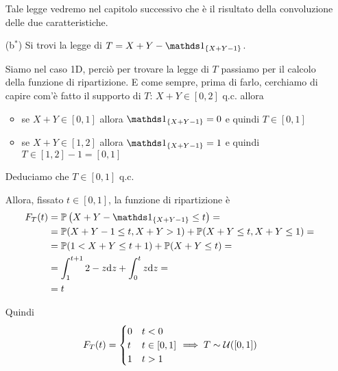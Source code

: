 \begin{enumerate}

\begin{oss} Tale legge vedremo nel capitolo successivo che è il risultato della convoluzione delle due caratteristiche. \end{oss}

\item [(b$^*$)] Si trovi la legge di $T=X+Y-\Ind_{\{ X+Y-1 \}}$.

Siamo nel caso 1D, perciò per trovare la legge di $T$ passiamo per il calcolo della funzione di ripartizione. E come sempre, prima di farlo, cerchiamo di capire com'è fatto il supporto di $T$: $X+Y\in[0,2]$ q.c. allora
\begin{itemize}
\item se $X+Y\in[0,1]$ allora $\Ind_{\{ X+Y-1 \}}=0$ e quindi $T\in[0,1]$
\item se $X+Y\in[1,2]$ allora $\Ind_{\{ X+Y-1 \}}=1$ e quindi $T\in[1,2]-1=[0,1]$
\end{itemize}
Deduciamo che $T\in[0,1]$ q.c.

Allora, fissato $t\in[0,1]$, la funzione di ripartizione è
\begin{gather*}
\begin{aligned}
F_T(t)&=\PP\left(X+Y-\Ind_{\{ X+Y-1 \}}\leq t  \right)=\\
&=\PP(X+Y-1\leq t,X+Y>1)+\PP(X+Y\leq t,X+Y\leq 1)=\\
&=\PP(1<X+Y\leq t+1)+\PP(X+Y\leq t)=\\
&=\int_1^{t+1}2-z\dz+\int_0^tz\dz=\\
&=t
\end{aligned}
\end{gather*}

Quindi
\[
F_T(t)=
\begin{cases}
0 &t<0 \\
t &t\in[0,1] \\
1 &t>1
\end{cases}
\implies T\sim\mathcal{U}([0,1])
\]

\end{enumerate}

